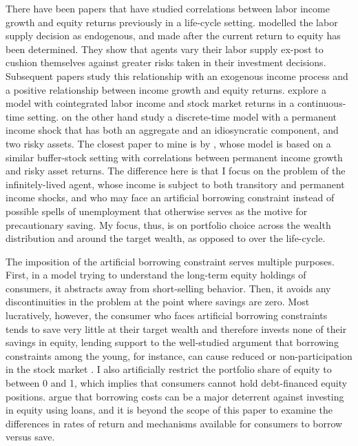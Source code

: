There have been papers that have studied correlations between labor income growth and equity returns previously in a life-cycle setting. \citet{Bodie1992} modelled the labor supply decision as endogenous, and made after the current return to equity has been determined. They show that agents vary their labor supply ex-post to cushion themselves against greater risks taken in their investment decisions. Subsequent papers study this relationship with an exogenous income process and a positive relationship between income growth and equity returns. \citet{Benzoni2007} explore a model with cointegrated labor income and stock market returns in a continuous-time setting. \citet{Bagliano2014} on the other hand study a discrete-time model with a permanent income shock that has both an aggregate and an idiosyncratic component, and two risky assets. The closest paper to mine is by \citet{Viceira2001}, whose model is based on a similar buffer-stock setting with correlations between permanent income growth and risky asset returns. The difference here is that I focus on the problem of the infinitely-lived agent, whose income is subject to both transitory and permanent income shocks, and who may face an artificial borrowing constraint instead of possible spells of unemployment that otherwise serves as the motive for precautionary saving. My focus, thus, is on portfolio choice across the wealth distribution and around the target wealth, as opposed to over the life-cycle.

The imposition of the artificial borrowing constraint serves multiple purposes. First, in a model trying to understand the long-term equity holdings of consumers, it abstracts away from short-selling behavior. Then, it avoids any discontinuities in the problem at the point where savings are zero. Most lucratively, however, the consumer who faces artificial borrowing constraints tends to save very little at their target wealth and therefore invests none of their savings in equity, lending support to the well-studied argument that borrowing constraints among the young, for instance, can cause reduced or non-participation in the stock market \citep{Constantinides2002, Haliassos2002, Kogan2007, Jang2015, Harenberg2018}. I also artificially restrict the portfolio share of equity to between 0 and 1, which implies that consumers cannot hold debt-financed equity positions. \citet{Davis2006} argue that borrowing costs can be a major deterrent against investing in equity using loans, and it is beyond the scope of this paper to examine the differences in rates of return and mechanisms available for consumers to borrow versus save.

